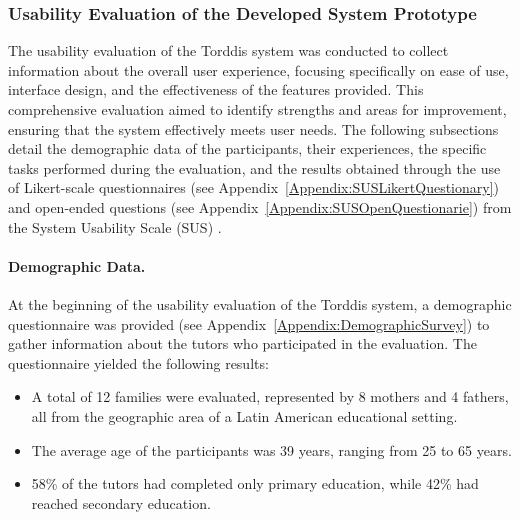                 \subsubsection{Usability Evaluation of the Developed System Prototype}
                The usability evaluation of the Torddis system was conducted to collect information about the overall user experience, focusing specifically on ease of use, interface design, and the effectiveness of the features provided. This comprehensive evaluation aimed to identify strengths and areas for improvement, ensuring that the system effectively meets user needs. The following subsections detail the demographic data of the participants, their experiences, the specific tasks performed during the evaluation, and the results obtained through the use of Likert-scale questionnaires (see Appendix~\ref{Appendix:SUSLikertQuestionary}) and open-ended questions (see Appendix~\ref{Appendix:SUSOpenQuestionarie}) from the System Usability Scale (SUS) \citep{Brooke1996SUS}.
                
                \paragraph{Demographic Data.}
                At the beginning of the usability evaluation of the Torddis system, a demographic questionnaire was provided (see Appendix~\ref{Appendix:DemographicSurvey}) to gather information about the tutors who participated in the evaluation. The questionnaire yielded the following results:
                
                \begin{itemize} 
                    \item A total of 12 families were evaluated, represented by 8 mothers and 4 fathers, all from the geographic area of a Latin American educational setting.
                    \item The average age of the participants was 39 years, ranging from 25 to 65 years.
                    \item 58\% of the tutors had completed only primary education, while 42\% had reached secondary education.
                \end{itemize}
                
